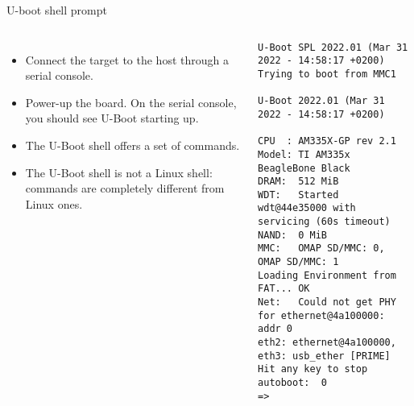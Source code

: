 \begin{frame}[fragile]{U-boot shell prompt}
  \begin{columns}
    \begin{itemize}
    \item Connect the target to the host through a serial console.
    \item Power-up the board. On the serial console, you should
      see U-Boot starting up.
    \item The U-Boot shell offers a set of commands.
    \item The U-Boot shell is not a Linux shell: commands are
      completely different from Linux ones.
    \end{itemize}
    \begin{block}{}
      {\tiny
\begin{verbatim}
U-Boot SPL 2022.01 (Mar 31 2022 - 14:58:17 +0200)
Trying to boot from MMC1

U-Boot 2022.01 (Mar 31 2022 - 14:58:17 +0200)

CPU  : AM335X-GP rev 2.1
Model: TI AM335x BeagleBone Black
DRAM:  512 MiB
WDT:   Started wdt@44e35000 with servicing (60s timeout)
NAND:  0 MiB
MMC:   OMAP SD/MMC: 0, OMAP SD/MMC: 1
Loading Environment from FAT... OK
Net:   Could not get PHY for ethernet@4a100000: addr 0
eth2: ethernet@4a100000, eth3: usb_ether [PRIME]
Hit any key to stop autoboot:  0
=>
\end{verbatim}
      }
    \end{block}
  \end{columns}
\end{frame}

